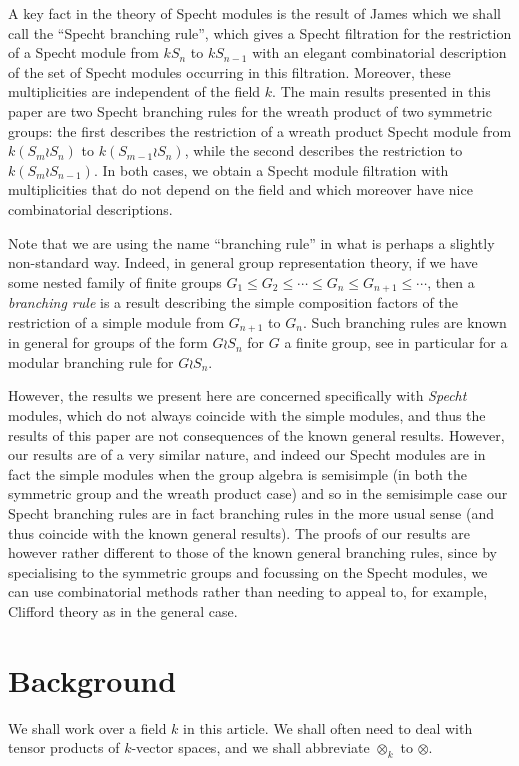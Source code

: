 \documentclass[ALCO,Unicode,published]{cedram}
\begin{document}
A key fact in the theory of Specht modules is the result of James which we shall call the ``Specht branching rule'',
which gives a Specht filtration for the restriction of a Specht module from $kS_n$ to $kS_{n-1}$ with an
elegant combinatorial description of the set of Specht modules occurring in this filtration. Moreover, these multiplicities are
independent of the field $k$. The main results presented in this paper are two Specht branching rules for the wreath product of two
symmetric groups: the first describes the restriction of a wreath product Specht module from $k(S_m \wr S_n)$ to $k(S_{m-1} \wr S_n)$,
while the second describes the restriction to $k(S_m \wr S_{n-1})$. In both cases, we obtain a Specht module filtration with
multiplicities that do not depend on the field and which moreover have nice combinatorial descriptions.

Note that we are using the name ``branching rule'' in what is perhaps a slightly non-standard way. Indeed, in general group
representation theory, if we have some nested family of finite groups $G_1 \leq G_2 \leq \cdots \leq G_n \leq G_{n+1} \leq \cdots$, then a
\textit{branching rule} is a result describing the simple composition factors of the restriction of a simple module from $G_{n+1}$ to
$G_n$. Such branching rules are known in general for groups of the form $G \wr S_n$ for $G$ a finite group, see in particular
\cite{TSUWRBR} for a modular branching rule for $G \wr S_n$.

However, the results we present here are concerned specifically with \textit{Specht} modules, which do not always coincide with the simple
modules, and thus the results of this paper are not consequences of the known general results. However, our results are of a very similar
nature, and indeed our Specht modules are in fact the simple modules when the group algebra is semisimple (in both the symmetric group
and the wreath product case) and so in the semisimple case our Specht branching rules are in fact branching rules in the more usual
sense (and thus coincide with the known general results). The proofs of our results are however rather different to those of the known
general branching rules, since by specialising to the symmetric groups and focussing on the Specht modules, we can use combinatorial
methods rather than needing to appeal to, for example, Clifford theory as in the general case.


\section{Background}
We shall work over a field $k$ in this article. We shall often need to deal with tensor products of $k$-vector spaces, and we shall
abbreviate $\otimes_k$ to $\otimes$.
\end{document}
